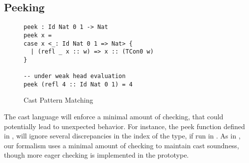 \subsection{Peeking}


\begin{figure}
\begin{lstlisting}[basicstyle=\ttfamily\small]
peek : Id Nat 0 1 -> Nat
peek x =
case x <_: Id Nat 0 1 => Nat> {
  | (refl _ x :: w) => x :: (TCon0 w)
}

-- under weak head evaluation
peek (refl 4 :: Id Nat 0 1) = 4
\end{lstlisting}
\caption{Cast Pattern Matching}
\label{fig:cast-peek}
\end{figure}

The cast language will enforce a minimal amount of checking, that could potentially lead to unexpected behavior.
For instance, the peek function defined in , will ignore several discrepancies in the index of the \Id{} type, if run in \whnf{}.
As  in , our formalism uses a minimal amount of checking to maintain cast soundness, though more eager checking is implemented in the prototype.